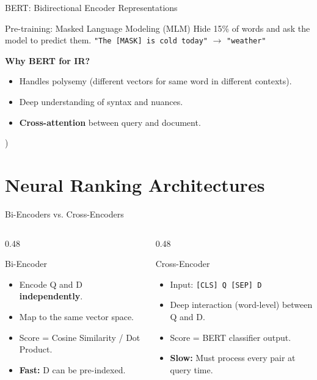 \documentclass[aspectratio=169]{beamer}
\begin{document}
\begin{frame}{BERT: Bidirectional Encoder Representations}
\begin{block}{Pre-training: Masked Language Modeling (MLM)}
Hide 15\% of words and ask the model to predict them.
\texttt{"The [MASK] is cold today"} $\rightarrow$ \texttt{"weather"}
\end{block}

\vspace{1em}
\textbf{Why BERT for IR?}
\begin{itemize}
    \item Handles polysemy (different vectors for same word in different contexts).
    \item Deep understanding of syntax and nuances.
    \item \textbf{Cross-attention} between query and document.
\end{itemize}
\end{frame}

) %
\section{Neural Ranking Architectures}

\begin{frame}{Bi-Encoders vs. Cross-Encoders}
\begin{columns}
\begin{column}{0.48\textwidth}
\begin{block}{Bi-Encoder}
\begin{itemize}
    \item Encode Q and D \textbf{independently}.
    \item Map to the same vector space.
    \item Score = Cosine Similarity / Dot Product.
    \item \textbf{Fast:} D can be pre-indexed.
\end{itemize}
\end{block}
\end{column}

\begin{column}{0.48\textwidth}
\begin{block}{Cross-Encoder}
\begin{itemize}
    \item Input: \texttt{[CLS] Q [SEP] D}
    \item Deep interaction (word-level) between Q and D.
    \item Score = BERT classifier output.
    \item \textbf{Slow:} Must process every pair at query time.
\end{itemize}
\end{block}
\end{column}
\end{columns}
\end{frame}
\end{document}
